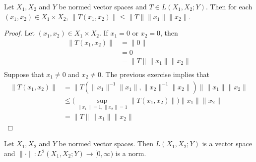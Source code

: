 \documentclass{book}
\begin{document}
	\begin{ex}
		Let $X_1, X_2$ and $Y$ be normed vector spaces and $T \in L(X_1, X_2;Y)$. Then for each $(x_1, x_2) \in X_1 \times X_2$, $\|T(x_1, x_2)\| \leq \|T\|\|x_1\|\|x_2\|$. 
	\end{ex}

	\begin{proof}
		Let $(x_1, x_2) \in X_1 \times X_2$. If $x_1 = 0$ or $x_2 = 0$, then 
		\begin{align*}
			\|T(x_1, x_2)\|
			& = \|0\| \\
			& = 0 \\
			& = \|T\|\|x_1\| \|x_2\| \\
		\end{align*}
		Suppose that $x_1 \neq 0$ and $x_2 \neq 0$. The previous exercise implies that 
		\begin{align*}
			\|T(x_1, x_2)\| 
			& = \|T(\|x_1\|^{-1}\|x_1\|, \|x_2\|^{-1}\|x_2\|)\| \|x_1\| \|x_2\| \\
			& \leq \bigg( \sup\limits_{\|x_1\|=1 ,\|x_2\| = 1 }\|T(x_1, x_2)\| \bigg)  \|x_1\| \|x_2\| \\
			& = \|T\| \|x_1\| \|x_2\|
		\end{align*}
	\end{proof}
	
	\begin{ex}
	Let $X_1, X_2$ and $Y$ be normed vector spaces. Then $L(X_1, X_2;Y)$ is a vector space and $\|\cdot\|: L^2(X_1, X_2; Y) \rightarrow [0, \infty)$ is a norm. 
	\end{ex}
	
\end{document}
